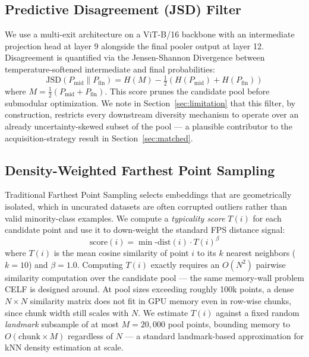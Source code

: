 \documentclass[conference]{IEEEtran}
\begin{document}
\subsection{Predictive Disagreement (JSD) Filter}
We use a multi-exit architecture on a ViT-B/16 backbone with an intermediate projection head at layer 9 alongside the final pooler output at layer 12. Disagreement is quantified via the Jensen-Shannon Divergence between temperature-softened intermediate and final probabilities:
\begin{equation}
\text{JSD}(P_{\text{mid}} \| P_{\text{fin}}) = H(M) - \tfrac{1}{2}\left(H(P_{\text{mid}}) + H(P_{\text{fin}})\right)
\end{equation}
where $M = \tfrac{1}{2}(P_{\text{mid}} + P_{\text{fin}})$. This score prunes the candidate pool before submodular optimization. We note in Section~\ref{sec:limitation} that this filter, by construction, restricts every downstream diversity mechanism to operate over an already uncertainty-skewed subset of the pool — a plausible contributor to the acquisition-strategy result in Section~\ref{sec:matched}.

\subsection{Density-Weighted Farthest Point Sampling}
\label{sec:fps}
Traditional Farthest Point Sampling selects embeddings that are geometrically isolated, which in uncurated datasets are often corrupted outliers rather than valid minority-class examples. We compute a \emph{typicality score} $T(i)$ for each candidate point and use it to down-weight the standard FPS distance signal:
\begin{equation}
\text{score}(i) = \min\text{-dist}(i) \cdot T(i)^{\beta}
\end{equation}
where $T(i)$ is the mean cosine similarity of point $i$ to its $k$ nearest neighbors ($k{=}10$) and $\beta{=}1.0$. Computing $T(i)$ exactly requires an $O(N^2)$ pairwise similarity computation over the candidate pool — the same memory-wall problem CELF is designed around. At pool sizes exceeding roughly 100k points, a dense $N \times N$ similarity matrix does not fit in GPU memory even in row-wise chunks, since chunk width still scales with $N$. We estimate $T(i)$ against a fixed random \emph{landmark} subsample of at most $M{=}20{,}000$ pool points, bounding memory to $O(\text{chunk} \times M)$ regardless of $N$ — a standard landmark-based approximation for kNN density estimation at scale.
\end{document}
